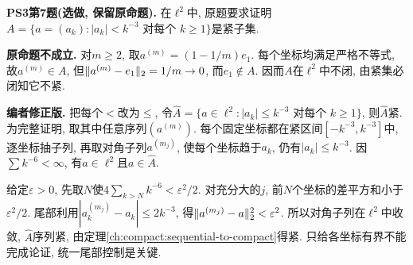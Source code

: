 \begin{exercise}\label{ps190:3:7}
\textbf{PS3第7题(选做, 保留原命题).} 在$\ell^2$中, 原题要求证明$A=\{a=(a_k):|a_k|<k^{-3}\text{ 对每个 }k\ge1\}$是紧子集.
\end{exercise}
\begin{solution}
\textbf{原命题不成立.} 对$m\ge2$, 取$a^{(m)}=(1-1/m)e_1$. 每个坐标均满足严格不等式, 故$a^{(m)}\in A$, 但$\lVert a^{(m)}-e_1\rVert_2=1/m\to0$, 而$e_1\notin A$. 因而$A$在$\ell^2$中不闭, 由紧集必闭知它不紧.

\textbf{编者修正版.} 把每个$<$改为$\le$, 令$\widehat A=\{a\in\ell^2:|a_k|\le k^{-3}\text{ 对每个 }k\ge1\}$, 则$\widehat A$紧. 为完整证明, 取其中任意序列$(a^{(m)})$. 每个固定坐标都在紧区间$[-k^{-3},k^{-3}]$中, 逐坐标抽子列, 再取对角子列$a^{(m_j)}$, 使每个坐标趋于$a_k$, 仍有$|a_k|\le k^{-3}$. 因$\sum k^{-6}<\infty$, 有$a\in\ell^2$且$a\in\widehat A$.

给定$\varepsilon>0$, 先取$N$使$4\sum_{k>N}k^{-6}<\varepsilon^2/2$. 对充分大的$j$, 前$N$个坐标的差平方和小于$\varepsilon^2/2$. 尾部利用$|a_k^{(m_j)}-a_k|\le2k^{-3}$, 得$\lVert a^{(m_j)}-a\rVert_2^2<\varepsilon^2$. 所以对角子列在$\ell^2$中收敛, $\widehat A$序列紧, 由定理\ref{ch:compact:sequential-to-compact}得紧. 只给各坐标有界不能完成论证, 统一尾部控制是关键.
\end{solution}

